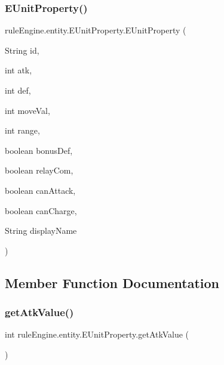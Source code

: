 \subsubsection{\texorpdfstring{E\+Unit\+Property()}{EUnitProperty()}}
{\footnotesize\ttfamily rule\+Engine.\+entity.\+E\+Unit\+Property.\+E\+Unit\+Property (\begin{DoxyParamCaption}\item[{String}]{id,  }\item[{int}]{atk,  }\item[{int}]{def,  }\item[{int}]{move\+Val,  }\item[{int}]{range,  }\item[{boolean}]{bonus\+Def,  }\item[{boolean}]{relay\+Com,  }\item[{boolean}]{can\+Attack,  }\item[{boolean}]{can\+Charge,  }\item[{String}]{display\+Name }\end{DoxyParamCaption})\hspace{0.3cm}{\ttfamily [inline]}}



\subsection{Member Function Documentation}
\mbox{\label{enumrule_engine_1_1entity_1_1_e_unit_property_a827c762c3ba5f1bde2858d069506087c}} 
\subsubsection{\texorpdfstring{get\+Atk\+Value()}{getAtkValue()}}
{\footnotesize\ttfamily int rule\+Engine.\+entity.\+E\+Unit\+Property.\+get\+Atk\+Value (\begin{DoxyParamCaption}{ }\end{DoxyParamCaption})\hspace{0.3cm}{\ttfamily [inline]}}

